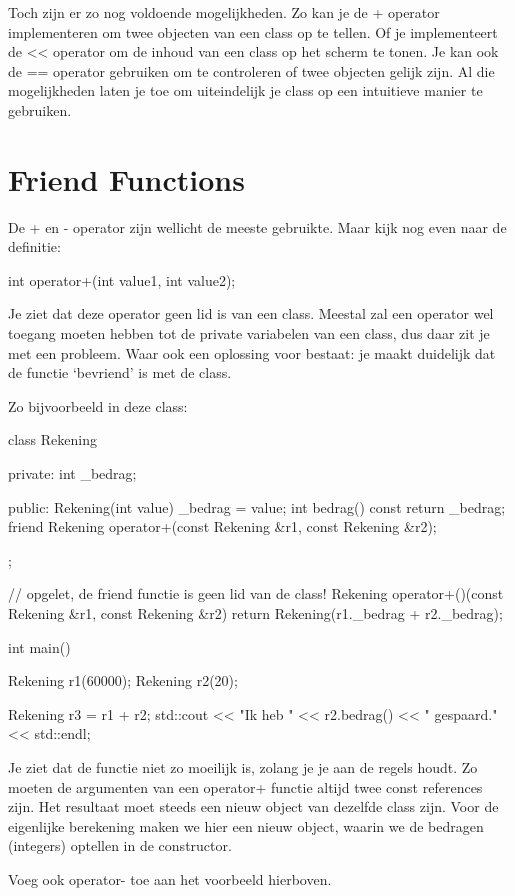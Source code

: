 \documentclass[11pt, oldfontcommands, oneside, a4paper]{memoir}
\begin{document}
Toch zijn er zo nog voldoende mogelijkheden. Zo kan je de + operator implementeren om twee objecten van een class op te tellen. Of je implementeert de << operator om de inhoud van een class op het scherm te tonen. Je kan ook de == operator gebruiken om te controleren of twee objecten gelijk zijn. Al die mogelijkheden laten je toe om uiteindelijk je class op een intuitieve manier te gebruiken.

\section{Friend Functions}
De + en - operator zijn wellicht de meeste gebruikte. Maar kijk nog even naar de definitie:

\begin{code}
int operator+(int value1, int value2);
\end{code}

Je ziet dat deze operator geen lid is van een class. Meestal zal een operator wel toegang moeten hebben tot de private variabelen van een class, dus daar zit je met een probleem. Waar ook een oplossing voor bestaat: je maakt duidelijk dat de functie `bevriend' is met de class.

Zo bijvoorbeeld in deze class:

\begin{code}
class Rekening {
private:
  int _bedrag;

public:
  Rekening(int value) { _bedrag = value; }
  int bedrag() const { return _bedrag; }
  friend Rekening operator+(const Rekening &r1, const Rekening &r2);
};

// opgelet, de friend functie is geen lid van de class!
Rekening operator+()(const Rekening &r1, const Rekening &r2) {
  return Rekening(r1._bedrag + r2._bedrag);
}

int main() {
  Rekening r1(60000);
  Rekening r2(20);

  Rekening r3 = r1 + r2;
  std::cout << "Ik heb " << r2.bedrag() << " gespaard." << std::endl;
}
\end{code}

Je ziet dat de functie niet zo moeilijk is, zolang je je aan de regels houdt. Zo moeten de argumenten van een operator+ functie altijd twee const references zijn. Het resultaat moet steeds een nieuw object van dezelfde class zijn. Voor de eigenlijke berekening maken we hier een nieuw object, waarin we de bedragen (integers) optellen in de constructor.

\begin{exercise}
Voeg ook operator- toe aan het voorbeeld hierboven.
\end{exercise}
\end{document}
